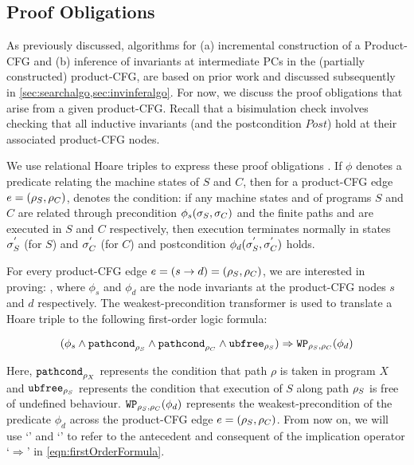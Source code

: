 \subsection{Proof Obligations}
\label{sec:proofobl}
As previously discussed, algorithms for (a) incremental construction of a Product-CFG
and (b) inference of invariants at intermediate PCs in the (partially constructed) product-CFG, are
based on prior work\cite{oopsla20} and discussed subsequently in \cref{sec:searchalgo,sec:invinferalgo}.
For now, we discuss the proof obligations that arise from a given product-CFG.
Recall that a bisimulation check involves checking that all inductive invariants
(and the postcondition $Post$) hold at their associated product-CFG nodes.

We use relational Hoare triples to express these proof obligations \cite{relationalHoareLogic,hoareTriple}.
If $\phi$ denotes a predicate relating the machine states of $S$ and $C$, then
for a product-CFG edge $e=({\tt \rho}_{S},{\tt \rho}_{C})$, 
denotes the condition:
if any machine states \sv{\sigma} and \cv{\sigma} of programs $S$ and $C$ are related through
precondition $\phi_s({\tt \sigma}_{S},{\tt \sigma}_{C})$ and the finite paths \sv{\rho} and \cv{\rho}
are executed in $S$ and $C$ respectively,
then execution terminates normally in states ${\tt \sigma}_{S}^{'}$ (for $S$) and
${\tt \sigma}_{C}^{'}$ (for $C$) and postcondition $\phi_d({\tt \sigma}_{S}^{'},{\tt \sigma}_{C}^{'})$ holds.

For every product-CFG edge $e = (s \rightarrow d) = ({\tt \rho}_{S}, {\tt \rho}_{C})$,
we are interested in proving: ,
where $\phi_s$ and $\phi_d$ are the node invariants at the product-CFG nodes $s$ and $d$
respectively.
The weakest-precondition transformer is used to translate a Hoare triple
 to the following
first-order logic formula:

\begin{equation}
\label{eqn:firstOrderFormula}
(\phi_s \land {\tt pathcond}_{{\tt \rho}_{S}} \land {\tt pathcond}_{{\tt \rho}_{C}} \land {\tt ubfree}_{{\tt \rho}_{S}}) \Rightarrow {\tt WP}_{{{\tt \rho}_{S},{\tt \rho}_{C}}}(\phi_d)
\end{equation}

Here, ${\tt pathcond}_{\rho_X}$ represents the condition that path $\rho$ is taken in program $X$
and ${\tt ubfree}_{{\tt \rho}_{S}}$ represents the condition that execution of $S$ along path ${\tt \rho}_{S}$
is free of undefined behaviour.
${\tt WP}_{{{\tt \rho}_{S},{\tt \rho}_{C}}}(\phi_d)$ represents the weakest-precondition
of the predicate $\phi_d$ across the product-CFG edge $e = ({\tt \rho}_{S},{\tt \rho}_{C})$.
From now on, we will use `\lhs{}' and `\rhs{}' to refer to the antecedent and consequent of
the implication operator `$\Rightarrow$' in \cref{eqn:firstOrderFormula}.

